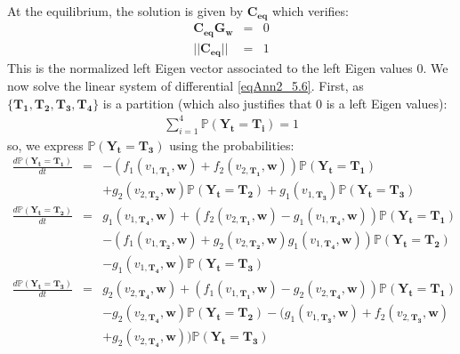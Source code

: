At the equilibrium, the solution is given by $\mathbf{C_{eq}}$ which verifies:
\begin{eqnarray}
\mathbf{C_{eq}}\mathbf{G_w} &=& 0 \\
||\mathbf{C_{eq}}|| &=& 1
\end{eqnarray}
This is the normalized left Eigen vector associated to the left Eigen values 0. We now solve the linear system of differential \eqref{eqAnn2_5.6}. First, as $\{ \mathbf{T_1}, \mathbf{T_2}, \mathbf{T_3}, \mathbf{T_4} \}$ is a partition (which also justifies that 0 is a left Eigen values):
\begin{eqnarray}
\label{eqAnn2_5.7} \sum_{i=1}^4 \mathbb{P}(\mathbf{Y_t}=\mathbf{T_i})=1
\end{eqnarray}
so, we express $\mathbb{P}(\mathbf{Y_t}=\mathbf{T_3})$ using the probabilities:
\begin{eqnarray}
\nonumber \frac{d\mathbb{P}(\mathbf{Y_t}=\mathbf{T_1})}{dt} &=& -(f_1(v_{1,\mathbf{T_1}},\mathbf{w}) + f_2(v_{2,\mathbf{T_1}},\mathbf{w})) \mathbb{P}(\mathbf{Y_t}=\mathbf{T_1})
\\  & & + g_2(v_{2,\mathbf{T_2}},\mathbf{w}) \mathbb{P}(\mathbf{Y_t}=\mathbf{T_2}) + g_1(v_{1,\mathbf{T_3}})\mathbb{P}(\mathbf{Y_t}=\mathbf{T_3}) \\
\nonumber \frac{d\mathbb{P}(\mathbf{Y_t}=\mathbf{T_2})}{dt} &=& g_1(v_{1,\mathbf{T_4}}, \mathbf{w})+(f_2(v_{2,\mathbf{T_1}}, \mathbf{w}) - g_1(v_{1,\mathbf{T_4}}, \mathbf{w}))\mathbb{P}(\mathbf{Y_t}=\mathbf{T_1}) \\
\nonumber  & & - (f_1(v_{1,\mathbf{T_2}}, \mathbf{w})+g_2(v_{2,\mathbf{T_2}}, \mathbf{w})
g_1(v_{1,\mathbf{T_4}}, \mathbf{w}))\mathbb{P}(\mathbf{Y_t}=\mathbf{T_2}) \\
 & & - g_1(v_{1,\mathbf{T_4}}, \mathbf{w})\mathbb{P}(\mathbf{Y_t}=\mathbf{T_3}) \\
\nonumber \frac{d\mathbb{P}(\mathbf{Y_t}=\mathbf{T_3})}{dt} &=& g_2(v_{2,\mathbf{T_4}}, \mathbf{w})+(f_1(v_{1,\mathbf{T_1}}, \mathbf{w})-g_2(v_{2,\mathbf{T_4}}, \mathbf{w}))\mathbb{P}(\mathbf{Y_t}=\mathbf{T_1}) \\
\nonumber & & - g_2(v_{2,\mathbf{T_4}}, \mathbf{w})\mathbb{P}(\mathbf{Y_t}=\mathbf{T_2})
-(g_1(v_{1,\mathbf{T_3}}, \mathbf{w})+f_2(v_{2,\mathbf{T_3}}, \mathbf{w}) \\
 & & + g_2(v_{2,\mathbf{T_4}}, \mathbf{w}))\mathbb{P}(\mathbf{Y_t}=\mathbf{T_3})
\end{eqnarray}
